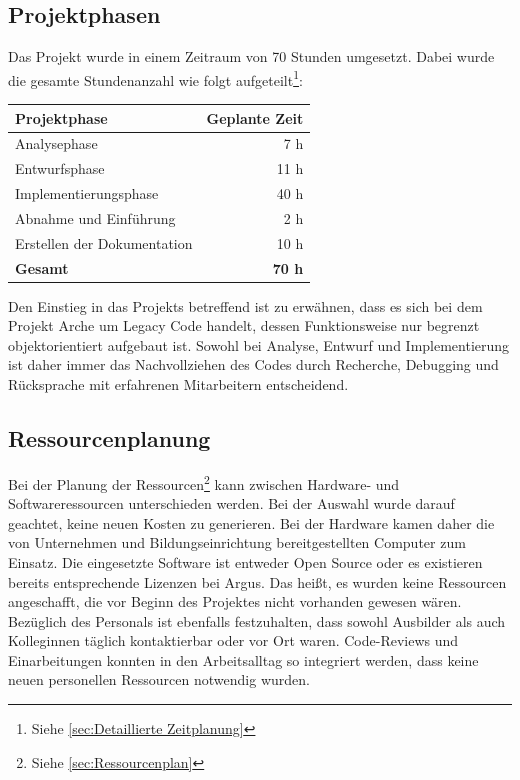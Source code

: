 \documentclass[11pt,toc=sectionentrywithoutdots, 
headheight=44pt, headings=optiontoheadandtoc, hyperfootnotes=false, hypertexnames=false]{scrartcl}
\newcommand\extendedref[1]{Siehe \ref{#1}}
\begin{document}
\subsection{Projektphasen}
Das Projekt wurde in einem Zeitraum von 70 Stunden umgesetzt. Dabei wurde die gesamte Stundenanzahl wie folgt aufgeteilt\footnote{\extendedref{sec:Detaillierte Zeitplanung}}:%

\begin{table}[ht]
	\begin{center}
		\begin{tabular}{ ||l|r|| }
			\hline
			\textbf{Projektphase} 		& \textbf{Geplante Zeit} \\
			\hline

			Analysephase 				& 7 h	 		\\
			Entwurfsphase				& 11 h	 		\\
			Implementierungsphase 		& 40 h	 		\\
			Abnahme und Einführung		& 2 h 			\\
			Erstellen der Dokumentation & 10 h 			\\
			\hline
			\textbf{Gesamt}	 			& \textbf{70 h}	\\
			
			\hline
		\end{tabular}
	\end{center}
\end{table}%

Den Einstieg in das Projekts betreffend ist zu erwähnen, dass es sich bei dem Projekt Arche um \gls{Legacy Code} handelt, dessen Funktionsweise nur begrenzt objektorientiert aufgebaut ist. Sowohl bei Analyse, Entwurf und Implementierung ist daher immer das Nachvollziehen des Codes durch Recherche, Debugging und Rücksprache mit erfahrenen Mitarbeitern entscheidend.

\subsection{Ressourcenplanung}
Bei der Planung der Ressourcen\footnote{\extendedref{sec:Ressourcenplan}} kann zwischen Hardware- und Softwareressourcen unterschieden werden. Bei der Auswahl wurde darauf geachtet, keine neuen Kosten zu generieren. Bei der Hardware kamen daher die von Unternehmen und Bildungseinrichtung bereitgestellten Computer zum Einsatz. Die eingesetzte Software ist entweder \gls{Open Source} oder es existieren bereits entsprechende Lizenzen bei Argus. Das heißt, es wurden keine Ressourcen angeschafft, die vor Beginn des Projektes nicht vorhanden gewesen wären. Bezüglich des Personals ist ebenfalls festzuhalten, dass sowohl Ausbilder als auch Kolleginnen täglich kontaktierbar oder vor Ort waren. Code-Reviews und Einarbeitungen konnten in den Arbeitsalltag so integriert werden, dass keine neuen personellen Ressourcen notwendig wurden.
\end{document}
